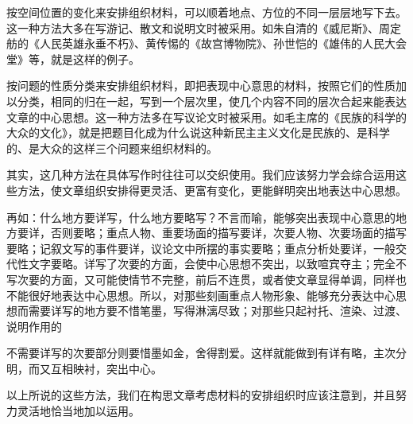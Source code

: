 按空间位置的变化来安排组织材料，可以顺着地点、方位的不同一层层地写下去。这一种方法大多在写游记、散文和说明文时被采用。如朱自清的《威尼斯》、周定舫的《人民英雄永垂不朽》、黄传惕的《故宫博物院》、孙世恺的《雄伟的人民大会堂》等，就是这样的例子。

按问题的性质分类来安排组织材料，即把表现中心意思的材料，按照它们的性质加以分类，相同的归在一起，写到一个层次里，使几个内容不同的层次合起来能表达文章的中心思想。这一种方法多在写议论文时被采用。如毛主席的《民族的科学的大众的文化》，就是把题目化成为什么说这种新民主主义文化是民族的、是科学的、是大众的这样三个问题来组织材料的。

其实，这几种方法在具体写作时往往可以交织使用。我们应该努力学会综合运用这些方法，使文章组织安排得更灵活、更富有变化，更能鲜明突出地表达中心思想。

再如：什么地方要详写，什么地方要略写？不言而喻，能够突出表现中心意思的地方要详，否则要略；重点人物、重要场面的描写要详，次要人物、次要场面的描写要略；记叙文写的事件要详，议论文中所摆的事实要略；重点分析处要详，一般交代性文字要略。详写了次要的方面，会使中心思想不突出，以致喧宾夺主；完全不写次要的方面，又可能使情节不完整，前后不连贯，或者使文章显得单调，同样也不能很好地表达中心思想。所以，对那些刻画重点人物形象、能够充分表达中心思想而需要详写的地方要不惜笔墨，写得淋漓尽致；对那些只起衬托、渲染、过渡、说明作用的

不需要详写的次要部分则要惜墨如金，舍得割爱。这样就能做到有详有略，主次分明，而又互相映衬，突出中心。

以上所说的这些方法，我们在构思文章考虑材料的安排组织时应该注意到，并且努力灵活地恰当地加以运用。
\newpage
